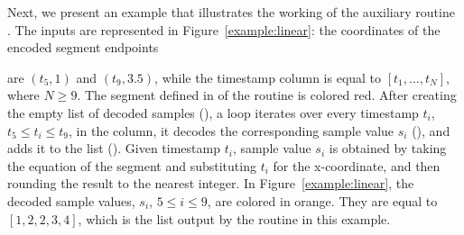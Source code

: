 Next, we present an example that illustrates the working of the auxiliary routine \decodeSegment. The inputs are represented in Figure~\ref{example:linear}: the coordinates of the encoded segment endpoints

\vspace{-12pt}
\begin{table}[h]
\begin{minipage}{0.45\textwidth}
are $(t_5,1)$ and $(t_9,3.5)$, while the timestamp column is equal to $[t_1,...,t_N]$, where $N \geq 9$. The segment defined in  of the routine is colored red. After creating the empty list of decoded samples (), a loop iterates over every timestamp $t_i$, $t_5 \leq t_i \leq t_9$, in the column, it decodes the corresponding sample value $s_i$ (), and adds it to the list (). Given timestamp $t_i$, sample value $s_i$ is obtained by taking the equation of the segment and substituting $t_i$ for the x-coordinate, and then rounding the result to the nearest integer. In Figure~\ref{example:linear}, the decoded sample values, $s_i$, $5 \leq i \leq 9$, are colored in orange. They are equal to $[1, 2, 2, 3, 4]$, which is the list output by the routine \decodeSegment in this example.
\end{minipage}
\hspace{0.02\textwidth}
\begin{minipage}{0.49\textwidth}
\examplelinear
\end{minipage}
\end{table}

